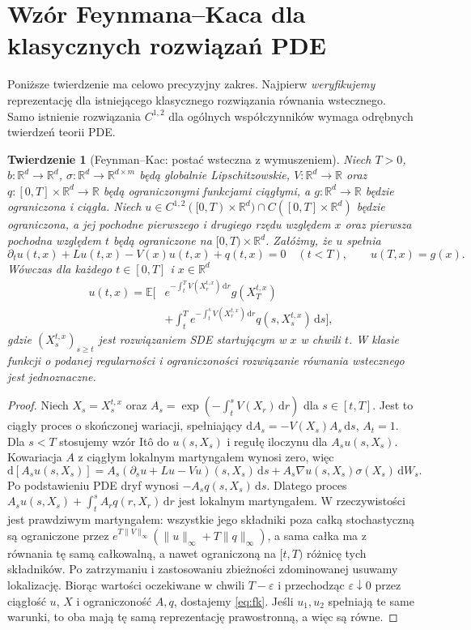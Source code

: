 \documentclass[11pt,a4paper,oneside]{report}
\numberwithin{equation}{chapter}
\theoremstyle{plain}
\newtheorem{twierdzenie}{Twierdzenie}[chapter]
\theoremstyle{definition}
\theoremstyle{remark}
\newcommand{\R}{\mathbb{R}}
\newcommand{\E}{\mathbb{E}}
\newcommand{\dd}{\mathrm{d}}
\newcommand{\norm}[1]{\lVert #1\rVert}
\begin{document}
\section{Wzór Feynmana--Kaca dla klasycznych rozwiązań PDE}

Poniższe twierdzenie ma celowo precyzyjny zakres.
Najpierw \emph{weryfikujemy} reprezentację dla
istniejącego klasycznego rozwiązania równania wstecznego.
Samo istnienie rozwiązania $C^{1,2}$ dla ogólnych
współczynników wymaga odrębnych twierdzeń teorii PDE.

\begin{twierdzenie}[Feynman--Kac: postać wsteczna z wymuszeniem]
\label{th:feynman-kac}
Niech $T>0$, $b:\R^d\to\R^d$,
$\sigma:\R^d\to\R^{d\times m}$ będą globalnie
Lipschitzowskie, $V:\R^d\to\R$ oraz
$q:[0,T]\times\R^d\to\R$ będą ograniczonymi funkcjami
ciągłymi, a $g:\R^d\to\R$ będzie ograniczona
i ciągła. Niech $u\in C^{1,2}([0,T)\times\R^d)
\cap C([0,T]\times\R^d)$ będzie ograniczona,
a jej pochodne pierwszego i drugiego rzędu względem
$x$ oraz pierwsza pochodna względem $t$ będą
ograniczone na $[0,T)\times\R^d$.
Załóżmy, że $u$ spełnia
\[
\partial_tu(t,x)+Lu(t,x)-V(x)u(t,x)+q(t,x)=0
\quad (t<T),\qquad u(T,x)=g(x).
\]
Wówczas dla każdego $t\in[0,T]$ i $x\in\R^d$
\[
\begin{split}
u(t,x)=\E\Big[&e^{-\int_t^T V(X_r^{t,x})\,\dd r}
                         g(X_T^{t,x})\\
 &+\int_t^T e^{-\int_t^s V(X_r^{t,x})\,\dd r}
                         q(s,X_s^{t,x})\,\dd s\Big],
\end{split}
\tag{7.1}\label{eq:fk}
\]
gdzie $(X_s^{t,x})_{s\ge t}$ jest rozwiązaniem SDE
startującym w $x$ w chwili $t$.
W klasie funkcji o podanej regularności i ograniczoności
rozwiązanie równania wstecznego jest jednoznaczne.
\end{twierdzenie}
\begin{proof}
Niech $X_s=X_s^{t,x}$ oraz
$A_s=\exp(-\int_t^sV(X_r)\,\dd r)$ dla $s\in[t,T]$.
Jest to ciągły proces o skończonej wariacji, spełniający
$\dd A_s=-V(X_s)A_s\,\dd s$, $A_t=1$.
Dla $s<T$ stosujemy wzór Itô do $u(s,X_s)$
i regułę iloczynu dla $A_su(s,X_s)$.
Kowariacja $A$ z ciągłym lokalnym martyngałem wynosi zero,
więc
\[
\dd[A_su(s,X_s)]
=A_s(\partial_su+Lu-Vu)(s,X_s)\,\dd s
 +A_s\nabla u(s,X_s)\sigma(X_s)\,\dd W_s.
\]
Po podstawieniu PDE dryf wynosi $-A_sq(s,X_s)\,\dd s$.
Dlatego proces
$A_su(s,X_s)+\int_t^sA_rq(r,X_r)\,\dd r$
jest lokalnym martyngałem. W rzeczywistości jest
prawdziwym martyngałem: wszystkie jego składniki poza
całką stochastyczną są ograniczone przez
$e^{T\norm V_\infty}(\norm u_\infty+T\norm q_\infty)$,
a sama całka ma z równania tę samą całkowalną,
a nawet ograniczoną na $[t,T)$ różnicę tych składników.
Po zatrzymaniu i zastosowaniu zbieżności zdominowanej
usuwamy lokalizację. Biorąc wartości oczekiwane
w chwili $T-\varepsilon$ i przechodząc $\varepsilon\downarrow0$
przez ciągłość $u$, $X$ i ograniczoność $A,q$, dostajemy
\eqref{eq:fk}.
Jeśli $u_1,u_2$ spełniają te same warunki, to oba
mają tę samą reprezentację prawostronną, a więc są równe.
\end{proof}
\end{document}
